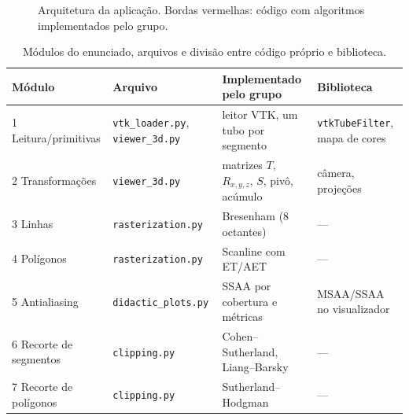 \documentclass[11pt, a4paper]{article}
\begin{document}
\begin{figure}[H]
\centering
{}
\caption{Arquitetura da aplicação. Bordas vermelhas: código com algoritmos implementados pelo grupo.}
\label{fig:arq}
\end{figure}

\begin{table}[H]
\centering\small
\caption{Módulos do enunciado, arquivos e divisão entre código próprio e biblioteca.}
\label{tab:modulos}
\begin{tabularx}{\textwidth}{l l X X}
\toprule
\textbf{Módulo} & \textbf{Arquivo} & \textbf{Implementado pelo grupo} & \textbf{Biblioteca} \\
\midrule
1 Leitura/primitivas & \texttt{vtk\_loader.py}, \texttt{viewer\_3d.py} & leitor VTK, um tubo por segmento & \texttt{vtkTubeFilter}, mapa de cores \\
2 Transformações & \texttt{viewer\_3d.py} & matrizes $T$, $R_{x,y,z}$, $S$, pivô, acúmulo & câmera, projeções \\
3 Linhas & \texttt{rasterization.py} & Bresenham (8 octantes) & --- \\
4 Polígonos & \texttt{rasterization.py} & Scanline com ET/AET & --- \\
5 Antialiasing & \texttt{didactic\_plots.py} & SSAA por cobertura e métricas & MSAA/SSAA no visualizador \\
6 Recorte de segmentos & \texttt{clipping.py} & Cohen--Sutherland, Liang--Barsky & --- \\
7 Recorte de polígonos & \texttt{clipping.py} & Sutherland--Hodgman & --- \\
\bottomrule
\end{tabularx}
\end{table}
\end{document}
